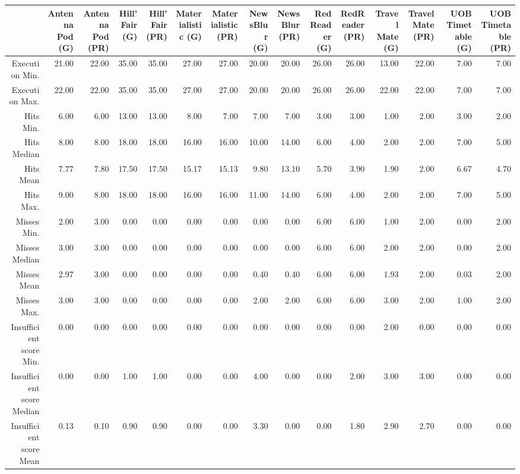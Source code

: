 \begin{table}[ht]
\centering
\begin{tabular}{rrrrrrrrrrrrrrr}
  \hline
 & Antenna Pod (G) & Antenna Pod (PR) & Hill'Fair (G) & Hill'Fair (PR) & Materialistic (G) & Materialistic (PR) & NewsBlur (G) & NewsBlur (PR) & RedReader (G) & RedReader (PR) & Travel Mate (G) & Travel Mate (PR) & UOB Timetable (G) & UOB Timetable (PR) \\ 
  \hline
Execution Min. & 21.00 & 22.00 & 35.00 & 35.00 & 27.00 & 27.00 & 20.00 & 20.00 & 26.00 & 26.00 & 13.00 & 22.00 & 7.00 & 7.00 \\ 
  Execution Max. & 22.00 & 22.00 & 35.00 & 35.00 & 27.00 & 27.00 & 20.00 & 20.00 & 26.00 & 26.00 & 22.00 & 22.00 & 7.00 & 7.00 \\ 
  Hits Min. & 6.00 & 6.00 & 13.00 & 13.00 & 8.00 & 7.00 & 7.00 & 7.00 & 3.00 & 3.00 & 1.00 & 2.00 & 3.00 & 2.00 \\ 
  Hits Median & 8.00 & 8.00 & 18.00 & 18.00 & 16.00 & 16.00 & 10.00 & 14.00 & 6.00 & 4.00 & 2.00 & 2.00 & 7.00 & 5.00 \\ 
  Hits Mean & 7.77 & 7.80 & 17.50 & 17.50 & 15.17 & 15.13 & 9.80 & 13.10 & 5.70 & 3.90 & 1.90 & 2.00 & 6.67 & 4.70 \\ 
  Hits Max. & 9.00 & 8.00 & 18.00 & 18.00 & 16.00 & 16.00 & 11.00 & 14.00 & 6.00 & 4.00 & 2.00 & 2.00 & 7.00 & 5.00 \\ 
  Misses Min. & 2.00 & 3.00 & 0.00 & 0.00 & 0.00 & 0.00 & 0.00 & 0.00 & 6.00 & 6.00 & 1.00 & 2.00 & 0.00 & 2.00 \\ 
  Misses Median & 3.00 & 3.00 & 0.00 & 0.00 & 0.00 & 0.00 & 0.00 & 0.00 & 6.00 & 6.00 & 2.00 & 2.00 & 0.00 & 2.00 \\ 
  Misses Mean & 2.97 & 3.00 & 0.00 & 0.00 & 0.00 & 0.00 & 0.40 & 0.40 & 6.00 & 6.00 & 1.93 & 2.00 & 0.03 & 2.00 \\ 
  Misses Max. & 3.00 & 3.00 & 0.00 & 0.00 & 0.00 & 0.00 & 2.00 & 2.00 & 6.00 & 6.00 & 3.00 & 2.00 & 1.00 & 2.00 \\ 
  Insufficient score Min. & 0.00 & 0.00 & 0.00 & 0.00 & 0.00 & 0.00 & 0.00 & 0.00 & 0.00 & 0.00 & 2.00 & 0.00 & 0.00 & 0.00 \\ 
  Insufficient score Median & 0.00 & 0.00 & 1.00 & 1.00 & 0.00 & 0.00 & 4.00 & 0.00 & 0.00 & 2.00 & 3.00 & 3.00 & 0.00 & 0.00 \\ 
  Insufficient score Mean & 0.13 & 0.10 & 0.90 & 0.90 & 0.00 & 0.00 & 3.30 & 0.00 & 0.00 & 1.80 & 2.90 & 2.70 & 0.00 & 0.00 \\ 

\end{tabular}
\end{table}
